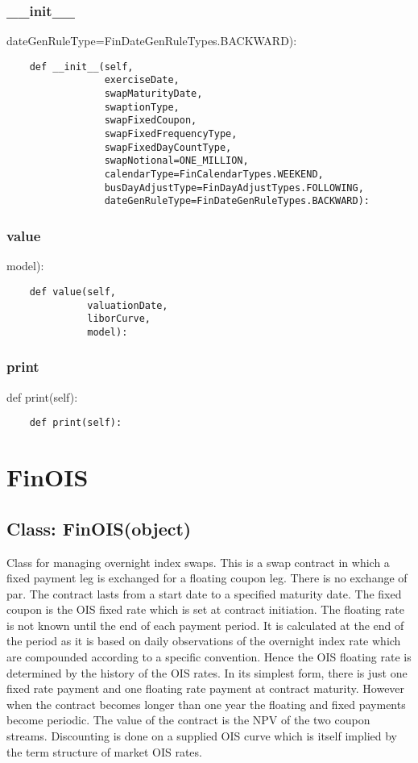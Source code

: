 \documentclass[twoside,11pt]{book}
\begin{document}
\subsubsection*{{\bf \_\_init\_\_}}
dateGenRuleType=FinDateGenRuleTypes.BACKWARD): 

\begin{lstlisting}
    def __init__(self,
                 exerciseDate,
                 swapMaturityDate,
                 swaptionType,
                 swapFixedCoupon,
                 swapFixedFrequencyType,
                 swapFixedDayCountType,
                 swapNotional=ONE_MILLION,
                 calendarType=FinCalendarTypes.WEEKEND,
                 busDayAdjustType=FinDayAdjustTypes.FOLLOWING,
                 dateGenRuleType=FinDateGenRuleTypes.BACKWARD):
\end{lstlisting}

\subsubsection*{{\bf value}}
model): 

\begin{lstlisting}
    def value(self,
              valuationDate,
              liborCurve,
              model):
\end{lstlisting}

\subsubsection*{{\bf print}}
def print(self): 

\begin{lstlisting}
    def print(self):
\end{lstlisting}

\newpage
\section{FinOIS}

\subsection*{Class: FinOIS(object)}
Class for managing overnight index swaps. This is a swap contract in which a fixed payment leg is exchanged for a floating coupon leg. There is no exchange of par.  The contract lasts from a start date to a specified maturity date. The fixed coupon is the OIS fixed rate which is set at contract initiation.  The floating rate is not known until the end of each payment period. It is calculated at the end of the period as it is based on daily observations of the overnight index rate which are compounded according to a specific convention. Hence the OIS floating rate is determined by the history of the OIS rates.  In its simplest form, there is just one fixed rate payment and one floating rate payment at contract maturity. However when the contract becomes longer than one year the floating and fixed payments become periodic.  The value of the contract is the NPV of the two coupon streams. Discounting is done on a supplied OIS curve which is itself implied by the term structure of market OIS rates.  
\end{document}
